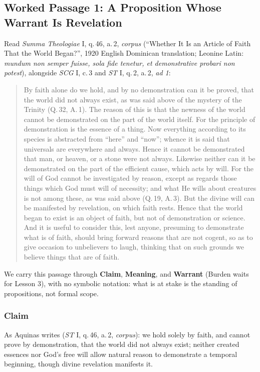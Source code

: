 \subsection{Worked Passage 1: A Proposition Whose Warrant Is Revelation}

Read \emph{Summa Theologiae} I, q.\,46, a.\,2, \emph{corpus} (``Whether It Is an Article of Faith That the World Began?'', 1920 English Dominican translation; Leonine Latin: \emph{mundum non semper fuisse, sola fide tenetur, et demonstrative probari non potest}), alongside \emph{SCG} I, c.\,3 and \emph{ST} I, q.\,2, a.\,2, \emph{ad 1}:

\begin{quote}
By faith alone do we hold, and by no demonstration can it be proved, that the world did not always exist, as was said above of the mystery of the Trinity (Q.\,32, A.\,1). The reason of this is that the newness of the world cannot be demonstrated on the part of the world itself. For the principle of demonstration is the essence of a thing. Now everything according to its species is abstracted from ``here'' and ``now''; whence it is said that universals are everywhere and always. Hence it cannot be demonstrated that man, or heaven, or a stone were not always. Likewise neither can it be demonstrated on the part of the efficient cause, which acts by will. For the will of God cannot be investigated by reason, except as regards those things which God must will of necessity; and what He wills about creatures is not among these, as was said above (Q.\,19, A.\,3). But the divine will can be manifested by revelation, on which faith rests. Hence that the world began to exist is an object of faith, but not of demonstration or science. And it is useful to consider this, lest anyone, presuming to demonstrate what is of faith, should bring forward reasons that are not cogent, so as to give occasion to unbelievers to laugh, thinking that on such grounds we believe things that are of faith.
\end{quote}

We carry this passage through \textbf{Claim}, \textbf{Meaning}, and \textbf{Warrant} (Burden waits for Lesson 3), with no symbolic notation: what is at stake is the standing of propositions, not formal scope.

\subsubsection*{Claim}
As Aquinas writes (\emph{ST} I, q.\,46, a.\,2, \emph{corpus}): we hold solely by faith, and cannot prove by demonstration, that the world did not always exist; neither created essences nor God's free will allow natural reason to demonstrate a temporal beginning, though divine revelation manifests it.

